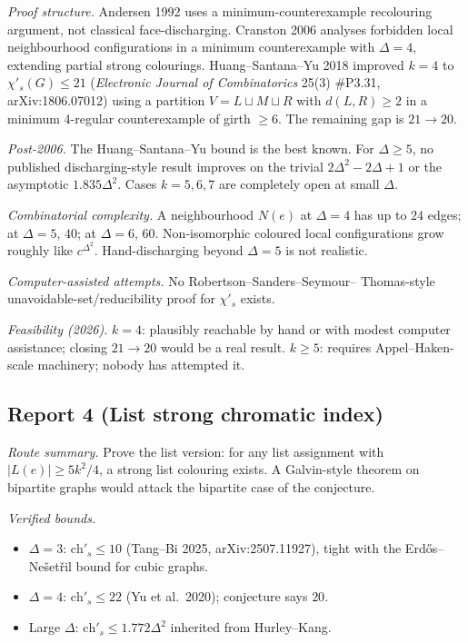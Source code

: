 \documentclass[11pt]{article}
\newcommand{\sci}{\chi'_s}
\begin{document}
\emph{Proof structure.} Andersen 1992 uses a minimum-counterexample
recolouring argument, not classical face-discharging. Cranston 2006
analyses forbidden local neighbourhood configurations in a minimum
counterexample with $\Delta=4$, extending partial strong colourings.
Huang--Santana--Yu 2018 improved $k=4$ to $\sci(G) \leq 21$
(\emph{Electronic Journal of Combinatorics} 25(3) \#P3.31,
arXiv:1806.07012) using a partition $V = L \sqcup M \sqcup R$ with
$d(L, R) \geq 2$ in a minimum 4-regular counterexample of girth $\geq 6$.
The remaining gap is $21 \to 20$.

\emph{Post-2006.} The Huang--Santana--Yu bound is the best known. For
$\Delta \geq 5$, no published discharging-style result improves on
the trivial $2\Delta^2 - 2\Delta + 1$ or the asymptotic
$1.835\Delta^2$. Cases $k = 5, 6, 7$ are completely open at small
$\Delta$.

\emph{Combinatorial complexity.} A neighbourhood $N(e)$ at
$\Delta = 4$ has up to $24$ edges; at $\Delta = 5$, $40$; at
$\Delta = 6$, $60$. Non-isomorphic coloured local configurations grow
roughly like $c^{\Delta^2}$. Hand-discharging beyond $\Delta = 5$ is
not realistic.

\emph{Computer-assisted attempts.} No Robertson--Sanders--Seymour--
Thomas-style unavoidable-set/reducibility proof for $\sci$ exists.

\emph{Feasibility (2026).} $k=4$: plausibly reachable by hand or with
modest computer assistance; closing $21 \to 20$ would be a real
result. $k \geq 5$: requires Appel--Haken-scale machinery; nobody
has attempted it.

\subsection*{Report 4 (List strong chromatic index)}

\emph{Route summary.} Prove the list version: for any list
assignment with $|L(e)| \geq 5k^2/4$, a strong list colouring exists.
A Galvin-style theorem on bipartite graphs would attack the
bipartite case of the conjecture.

\emph{Verified bounds.}
\begin{itemize}[leftmargin=*, itemsep=2pt]
  \item $\Delta = 3$: $\mathrm{ch}'_s \leq 10$ (Tang--Bi 2025,
        arXiv:2507.11927), tight with the Erd\H{o}s--Ne\v{s}et\v{r}il
        bound for cubic graphs.
  \item $\Delta = 4$: $\mathrm{ch}'_s \leq 22$ (Yu et al.\ 2020); conjecture
        says $20$.
  \item Large $\Delta$: $\mathrm{ch}'_s \leq 1.772\Delta^2$ inherited from
        Hurley--Kang.
\end{itemize}
\end{document}
